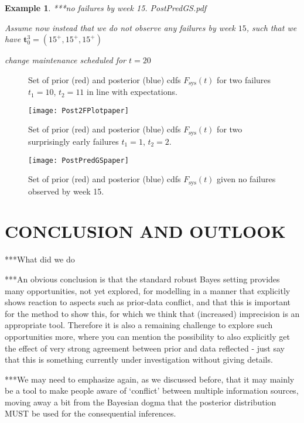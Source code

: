 \documentclass[12pt,a4paper,twocolumn,fleqn]{narms}
\renewcommand{\vec}[1]{{\bm#1}}
\newtheorem{example}{Example}
\begin{document}
\begin{example}
\label{ex:3}
***no failures by week 15. PostPredGS.pdf

Assume now instead that we do not observe any failures by week $15$,
such that we have $\vec{t}_0^3 = (15^+, 15^+, 15^+)$

change maintenance scheduled for $t=20$
\end{example}


\begin{figure}
\caption{Set of prior (red) and posterior (blue) cdfs $F_\text{sys}(t)$ for two failures $t_1 = 10$, $t_2 = 11$ in line with expectations.}
\label{fig:exampletwofailuresinline}
\end{figure}

\begin{figure}
\texttt{[image: Post2FPlotpaper]}
\caption{Set of prior (red) and posterior (blue) cdfs $F_\text{sys}(t)$ for two surprisingly early failures $t_1 = 1$, $t_2 = 2$.}
\label{fig:exampletwoearlyfailures}
\end{figure}

\begin{figure}
\texttt{[image: PostPredGSpaper]}
\caption{Set of prior (red) and posterior (blue) cdfs $F_\text{sys}(t)$ given no failures observed by week 15.}
\label{fig:examplenofailures}
\end{figure}

\section{CONCLUSION AND OUTLOOK}
\label{sec:conclusion}

***What did we do

***An obvious conclusion is that
the standard robust Bayes setting provides many opportunities, not yet explored, for modelling
in a manner that explicitly shows reaction to aspects such as prior-data conflict, and that this
is important for the method to show this, for which we think that (increased) imprecision is an
appropriate tool. Therefore it is also a remaining challenge to explore such opportunities more,
where you can mention the possibility to also explicitly get the effect of very strong agreement
between prior and data reflected - just say that this is something currently under investigation
without giving details.

***We may need to emphasize again, as we discussed before, that it may
mainly be a tool to make people aware of `conflict' between multiple information sources,
moving away a bit from the Bayesian dogma that the posterior distribution MUST
be used for the consequential inferences.
\end{document}
